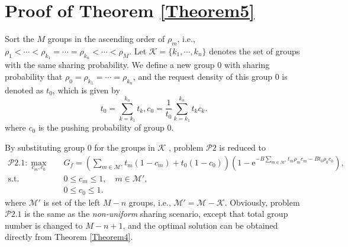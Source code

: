 \documentclass[12pt, draftclsnofoot, onecolumn]{IEEEtran}
\begin{document}
\section{Proof of Theorem \ref{Theorem5}}
\setcounter{equation}{0}
\renewcommand{\theequation}{\thesection.\arabic{equation}}
Sort the $M$ groups in the  ascending order of $\rho_m$, i.e.,  $\rho_1 <\cdots <\rho_{k_1}= \cdots =\rho_{k_n}<\cdots< \rho_M$. Let $\mathcal{K}=\{k_1,\cdots,k_n\}$ denotes the set of groups with the same sharing probability. We define a new group 0 with sharing probability that $\rho_0 =\rho_{k_1}=\cdots =\rho_{k_n}$, and the request density of this group 0 is denoted as $t_0$, which is given by
\begin{equation} \label{group0}
t_0 = \sum\limits_{k=k_1}^{k_n} t_k,c_0 =\frac{1}{t_0}\sum\limits_{k=k_1}^{k_n} t_kc_k.
\end{equation}
where $c_0$ is the pushing probability of group 0.

By substituting group 0 for the groups in $\mathcal{K}$
, problem $\mathcal{P}2$ is reduced to
\begin{subequations}
\begin{align}
 \mathcal{P}2.1:\mathop{\max }_{c_m,c_0}
                  &\quad   G_{f} = \left(\sum \limits_{m \in \mathcal{M}'} t_m  (1- c_m)+t_0(1-c_0) \right)
                                  \left ( 1 - \textrm{e}^{-B\sum \limits_{m \in \mathcal{M}'}t_m \rho_m c_m-Bt_0 \rho_0 c_0}  \right),       \label{optU}   \\
\textrm{s.t.} &\quad 0\leq c_m \leq 1 ,\quad m \in  \mathcal{M}', \\
&\quad 0\leq c_0 \leq 1.
\end{align}
\end{subequations}
where $\mathcal{M}'$ is set of the left $M-n$ groups, i.e., $\mathcal{M}' = \mathcal{M}-\mathcal{K}$. Obviously, problem $\mathcal{P}2.1$ is the same as the \textit{non-uniform} sharing scenario, except that total group number is changed to $M-n+1$, and the optimal solution can be obtained directly from Theorem \ref{Theorem4}.
\end{document}
